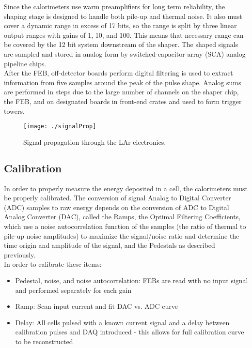 Since the calorimeters use warm preamplifiers for long term reliability, the shaping stage is designed to handle both pile-up and thermal noise.  It also must cover a dynamic range in excess of 17 bits, so the range is split by three linear output ranges with gains of 1, 10, and 100.  This means that necessary range can be covered by the 12 bit system downstream of the shaper.  The shaped signals are sampled and stored in analog form by switched-capacitor array (SCA) analog pipeline chips.  \\

After the FEB, off-detector boards perform digital filtering is used to extract information from five samples around the peak of the pulse shape.  Analog sums are performed in steps due to the large number of channels on the shaper chip, the FEB, and on designated boards in front-end crates and used to form trigger towers.  \\


\begin{figure}[h!]
  \centering
	\texttt{[image: ./signalProp]}
\caption{\label{fig:sigProp}{ Signal propagation through the LAr electronics. \color{red}{Replace with higher resolution image, find a source (taken from ecal presentation.} }} %
\end{figure}

\subsection{Calibration}

In order to properly measure the energy deposited in a cell, the calorimeters must be properly calibrated.  The conversion of signal Analog to Digital Converter (ADC) samples to raw energy depends on the conversion of ADC to Digital Analog Converter (DAC), called the Ramps, the Optimal Filtering Coefficients, which use a noise autocorrelation function of the samples (the ratio of thermal to pile-up noise amplitudes) to maximize the signal/noise ratio and determine the time origin and amplitude of the signal, and the Pedestals as described previously. \\


In order to calibrate these items:
\begin{itemize}
	\item Pedestal, noise, and noise autocorrelation: FEBs are read with no input signal and performed separately for each gain
	\item Ramp: Scan input current and fit DAC vs. ADC curve
	\item Delay: All cells pulsed with a known current signal and a delay between calibration pulses and DAQ introduced - this allows for full calibration curve to be reconstructed
\end{itemize}

